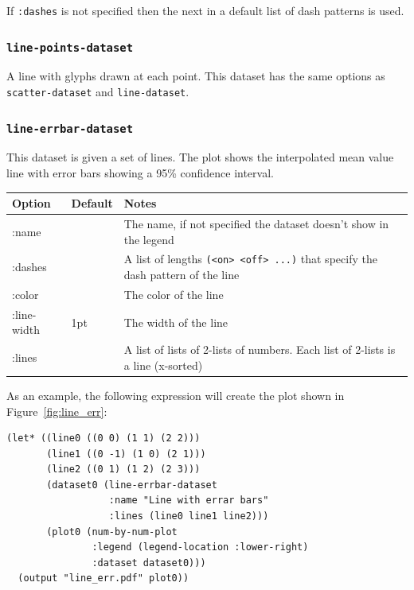 \documentclass{article}
\begin{document}
If {\tt :dashes} is not specified then the next in a default list of
dash patterns is used.

\subsubsection{\tt line-points-dataset}

A line with glyphs drawn at each point.  This dataset has the same
options as {\tt scatter-dataset} and {\tt line-dataset}.

\subsubsection{\tt line-errbar-dataset}

This dataset is given a set of lines.  The plot shows the interpolated
mean value line with error bars showing a 95\% confidence interval.

\begin{center}
\begin{tabular}{lll}
Option & Default & Notes \\
\hline
:name & & The name, if not specified the dataset doesn't show in
the legend\\
:dashes & & A list of lengths {\tt (<on> <off> ...)} that specify the
dash pattern of the line\\
:color & & The color of the line\\
:line-width & 1pt & The width of the line\\
:lines & & A list of lists of 2-lists of numbers.  Each list of
2-lists is a line (x-sorted)\\
\end{tabular}
\end{center}

As an example, the following expression will create the plot shown in
Figure~\ref{fig:line_err}:

\begin{verbatim}
(let* ((line0 ((0 0) (1 1) (2 2)))
       (line1 ((0 -1) (1 0) (2 1)))
       (line2 ((0 1) (1 2) (2 3)))
       (dataset0 (line-errbar-dataset
                  :name "Line with errar bars"
                  :lines (line0 line1 line2)))
       (plot0 (num-by-num-plot
               :legend (legend-location :lower-right)
               :dataset dataset0)))
  (output "line_err.pdf" plot0))
\end{verbatim}
\end{document}
